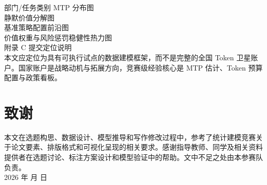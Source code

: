 部门/任务类别 MTP 分布图\\

静默价值分解图\\

基准策略配置前沿图\\

价值权重与风险惩罚稳健性热力图\\

附录 C  提交定位说明\\

本文应定位为具有可执行试点的数据建模框架，而不是完整的全国 Token 卫星账户。国家账户是战略动机与拓展方向，竞赛级经验核心是 MTP 估计、Token 预算配置与政策看板。\\



\section{致谢}

本文在选题构思、数据设计、模型推导和写作修改过程中，参考了统计建模竞赛关于论文要素、排版格式和可视化呈现的相关要求。感谢指导教师、同学及相关资料提供者在选题讨论、标注方案设计和模型验证中的帮助。文中不足之处由本参赛队负责。\\

2026 年    月    日\\

\endgroup